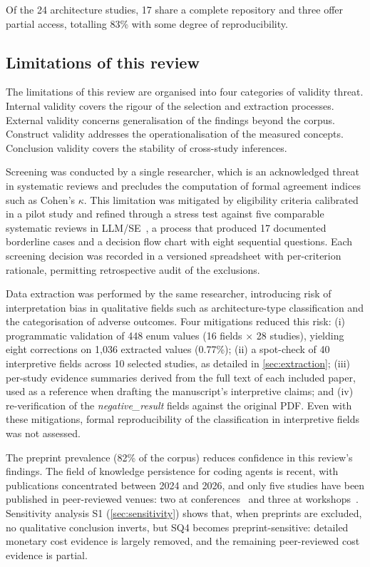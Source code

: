Of the 24 architecture studies, 17 share a complete repository and
three offer partial access, totalling 83\% with some degree of
reproducibility.

\subsection{Limitations of this review}
\label{sec:limitacoes}

The limitations of this review are organised into four categories of
validity threat.
Internal validity covers the rigour of the selection and extraction
processes.
External validity concerns generalisation of the findings beyond the
corpus.
Construct validity addresses the operationalisation of the measured
concepts.
Conclusion validity covers the stability of cross-study inferences.

Screening was conducted by a single researcher, which is an
acknowledged threat in systematic reviews and precludes the computation
of formal agreement indices such as Cohen's $\kappa$.
This limitation was mitigated by eligibility criteria calibrated in a
pilot study and refined through a stress test against five comparable
systematic reviews in
LLM/SE~\citep{hou2024llmse,zhang2024unifying,jin2024llmagents,wang2024llmagents,liu2024llmagents},
a process that produced 17 documented borderline cases and a decision
flow chart with eight sequential questions.
Each screening decision was recorded in a versioned spreadsheet with
per-criterion rationale, permitting retrospective audit of the
exclusions.

Data extraction was performed by the same researcher, introducing risk
of interpretation bias in qualitative fields such as architecture-type
classification and the categorisation of adverse outcomes.
Four mitigations reduced this risk: (i) programmatic validation of 448
enum values (16 fields $\times$ 28 studies), yielding eight corrections
on 1{,}036 extracted values (0.77\%);
(ii) a spot-check of 40 interpretive fields across 10 selected studies,
as detailed in \autoref{sec:extraction};
(iii) per-study evidence summaries derived from the full text of each
included paper, used as a reference when drafting the manuscript's
interpretive claims;
and (iv) re-verification of the \textit{negative\_result} fields
against the original PDF.
Even with these mitigations, formal reproducibility of the
classification in interpretive fields was not assessed.

The preprint prevalence (82\% of the corpus) reduces confidence in this
review's findings.
The field of knowledge persistence for coding agents is recent, with
publications concentrated between 2024 and 2026, and only five studies
have been published in peer-reviewed venues: two at
conferences~\citep{wang2026improving,zhang2025darwingodel} and three at
workshops~\citep{deshpande2025memtrack,shen2025talm,lindenbauer2025ctimrover}.
Sensitivity analysis S1 (\autoref{sec:sensitivity}) shows that,
when preprints are excluded, no qualitative conclusion inverts, but SQ4
becomes preprint-sensitive:
detailed monetary cost evidence is largely removed, and the remaining
peer-reviewed cost evidence is partial.

